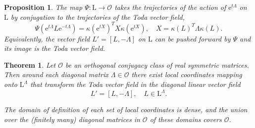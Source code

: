 \documentclass[10pt,a4paper]{amsart}
\newtheorem{theorem}{Theorem}
\newtheorem{proposition}{Proposition}
\renewcommand{\L}{\mathrm{L}}
\newcommand{\cO}{\mathcal{O}}
\begin{document}
\begin{proposition}\label{pro:Toda}
The map $\Psi: \L\to \cO $ takes  the trajectories of the action of $\mathrm{e}^{t\Lambda}$ on $\L$ by conjugation to the trajectories of the Toda vector field,
\[\Psi(\mathrm{e}^{t\Lambda}L\mathrm{e}^{-t\Lambda})=\kappa(\mathrm{e}^{tX})^T X  \kappa(\mathrm{e}^{tX}),
\quad X=\kappa(L)^T\Lambda \kappa(L).\]
Equivalently, the vector field  $L'=[L,-\Lambda]$  on $\L$
can be pushed forward by $\Psi$ and its image is the Toda vector field.
\end{proposition}

\begin{theorem}\label{thm:main} Let  $\cO$ be an orthogonal conjugacy class of real symmetric matrices.
	Then around each diagonal matrix $\Lambda\in \cO$ there exist local coordinates mapping onto $\L^\Lambda$
that transform the Toda vector field in the  diagonal linear  vector field
  \begin{equation}\label{eq:Toda-coordinates}
  L'=[L,-\Lambda],\quad L\in \L^\Lambda.
  \end{equation}

The domain of definition of each set of local coordinates is dense, and the union over the (finitely many) diagonal matrices in $\cO$ of these domains covers $\cO$.
\end{theorem}
\end{document}
